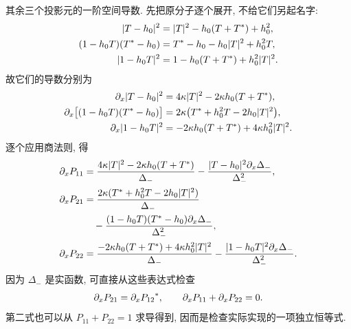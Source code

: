 \par\smallskip\noindent 其余三个投影元的一阶空间导数.\quad
先把原分子逐个展开, 不给它们另起名字:
\begin{align*}
|T-h_0|^2&=|T|^2-h_0(T+{T}^{*})+h_0^2,\\
(1-h_0T)({T}^{*}-h_0)
&={T}^{*}-h_0-h_0|T|^2+h_0^2T,\\
|1-h_0T|^2&=1-h_0(T+{T}^{*})+h_0^2|T|^2.
\end{align*}
故它们的导数分别为
\begin{align*}
\partial_x|T-h_0|^2
&=4\kappa|T|^2-2\kappa h_0(T+{T}^{*}),\\
\partial_x\bigl[(1-h_0T)({T}^{*}-h_0)\bigr]
&=2\kappa\bigl({T}^{*}+h_0^2T-2h_0|T|^2\bigr),\\
\partial_x|1-h_0T|^2
&=-2\kappa h_0(T+{T}^{*})+4\kappa h_0^2|T|^2.
\end{align*}
逐个应用商法则, 得
\begin{align*}
\partial_xP_{11}
&=\dfrac{4\kappa|T|^2-2\kappa h_0(T+{T}^{*})}{\Delta_-}
-\dfrac{|T-h_0|^2\partial_x\Delta_-}{\Delta_-^2},\\
\partial_xP_{21}
&=\dfrac{2\kappa({T}^{*}+h_0^2T-2h_0|T|^2)}{\Delta_-}\\
&\quad-\dfrac{(1-h_0T)({T}^{*}-h_0)
\partial_x\Delta_-}{\Delta_-^2},\\
\partial_xP_{22}
&=\dfrac{-2\kappa h_0(T+{T}^{*})+4\kappa h_0^2|T|^2}{\Delta_-}
-\dfrac{|1-h_0T|^2\partial_x\Delta_-}{\Delta_-^2}.
\end{align*}
因为 $\Delta_-$ 是实函数, 可直接从这些表达式检查
\begin{equation*}
\partial_xP_{21}={\partial_xP_{12}}^{*},
\qquad
\partial_xP_{11}+\partial_xP_{22}=0.
\end{equation*}
第二式也可以从 $P_{11}+P_{22}=1$ 求导得到, 因而是检查实际实现的一项独立恒等式.

